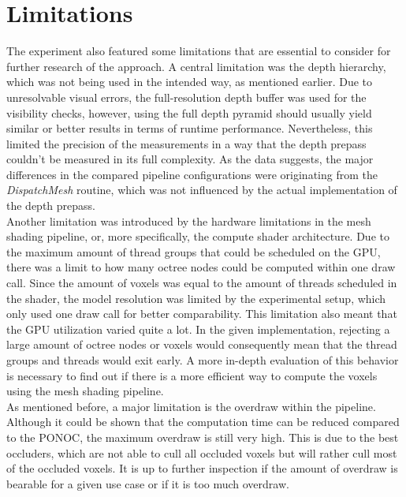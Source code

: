 \section{Limitations}

The experiment also featured some limitations that are essential to consider for further research of the approach.
A central limitation was the depth hierarchy, which was not being used in the intended way, as mentioned earlier.
Due to unresolvable visual errors, the full-resolution depth buffer was used for the visibility checks, however, 
using the full depth pyramid should usually yield similar or better results in terms of runtime performance. 
Nevertheless, this limited the precision of the measurements in a way that the depth prepass couldn't be measured 
in its full complexity. As the data suggests, the major differences in the compared pipeline configurations were 
originating from the \emph{DispatchMesh} routine, which was not influenced by the actual implementation of the 
depth prepass. \\

\noindent
Another limitation was introduced by the hardware limitations in the mesh shading pipeline, or, more specifically, the 
compute shader architecture. Due to the maximum amount of thread groups that could be scheduled on the \ac{GPU}, there 
was a limit to how many octree nodes could be computed within one draw call. Since the amount of voxels was equal to the 
amount of threads scheduled in the shader, the model resolution was limited by the experimental setup, which only used 
one draw call for better comparability. This limitation also meant that the \ac{GPU} utilization varied quite a lot. 
In the given implementation, rejecting a large amount of octree nodes or voxels would consequently mean that the 
thread groups and threads would exit early. A more in-depth evaluation of this behavior is necessary to find out if 
there is a more efficient way to compute the voxels using the mesh shading pipeline. \\

\noindent
As mentioned before, a major limitation is the overdraw within the pipeline. Although it could be shown that the 
computation time can be reduced compared to the \ac{PONOC}, the maximum overdraw is still very high. This is due 
to the best occluders, which are not able to cull all occluded voxels but will rather cull most of the occluded 
voxels. It is up to further inspection if the amount of overdraw is bearable for a given use case or if it is too 
much overdraw. \\


